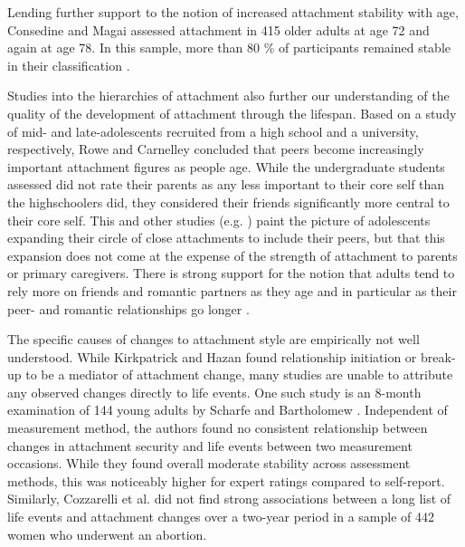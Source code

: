 \documentclass[12pt]{report}
\begin{document}
Lending further support to the notion of increased attachment stability with age, Consedine and Magai assessed attachment in 415 older adults at age 72 and again at age 78.
In this sample, more than 80 \% of participants remained stable in their classification \cite{Magai2016}.

Studies into the hierarchies of attachment also further our understanding of the quality of the development of attachment through the lifespan.
Based on a study of mid- and late-adolescents recruited from a high school and a university, respectively, Rowe and Carnelley \citeyear{Rowe2005} concluded that peers become increasingly important attachment figures as people age. While the undergraduate students assessed did not rate their parents as any less important to their core self than the highschoolers did, they considered their friends significantly more central to their core self.
This and other studies (e.g. ) paint the picture of adolescents expanding their circle of close attachments to include their peers, but that this expansion does not come at the expense of the strength of attachment to parents or primary caregivers.
There is strong support for the notion that adults tend to rely more on friends and romantic partners as they age and in particular as their peer- and romantic relationships go longer \cite{Tancredy2006,Doherty2004,Fraley1997}.

The specific causes of changes to attachment style are empirically not well understood.
While Kirkpatrick and Hazan \citeyear{Kirkpatrick1994} found relationship initiation or break-up to be a mediator of attachment change, many studies are unable to attribute any observed changes directly to life events.
One such study is an 8-month examination of 144 young adults by Scharfe and Bartholomew \citeyear{Scharfe1994}.
Independent of measurement method, the authors found no consistent relationship between changes in attachment security and life events between two measurement occasions.
While they found overall moderate stability across assessment methods, this was noticeably higher for expert ratings compared to self-report.
Similarly, Cozzarelli et al. \citeyear{Cozzarelli2003} did not find strong associations between a long list of life events and attachment changes over a two-year period in a sample of 442 women who underwent an abortion.
\end{document}
